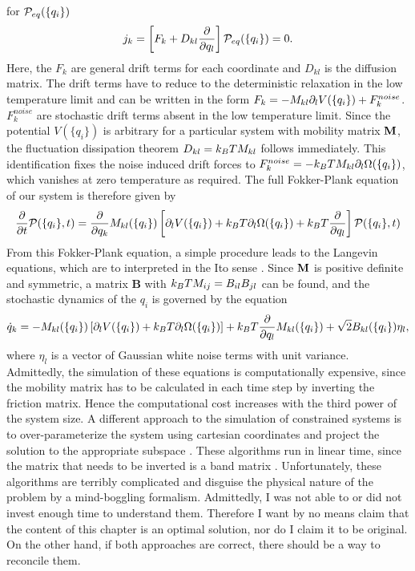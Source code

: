 for ${\cal P}_{eq}(\{q_i\})$
\begin{equation}
\label{eq:probFlux}
	j_k= \left[F_k +D_{kl} \frac{\partial }{\partial q_l} \right]{\cal P}_{eq}(\{q_i\})=0.
\end{equation}
Here, the $F_k$ are general drift terms for each coordinate and $D_{kl}$ is the diffusion matrix. 
The  drift terms have to reduce to the deterministic relaxation
in the low temperature limit and can be written in the form $F_k=-M_{kl}\partial_l V(\{q_i\})+F_k^{noise}$.
$F_k^{noise}$ are stochastic drift terms absent in the low temperature limit. Since
the potential $V(\{q_i\})$ is arbitrary for a particular system with mobility matrix $\mathbf{M}$, 
the fluctuation dissipation theorem $D_{kl}=k_BT M_{kl}$ follows immediately. This identification 
fixes the noise induced drift forces to $F_k^{noise}=-k_BT M_{kl} \partial_l \Omega(\{q_i\})$, which 
vanishes at zero temperature as required.
The full Fokker-Plank equation of our system is therefore given by
\begin{equation}
\label{eq:ContrainedFPE}
\frac{\partial }{\partial t}{\cal P}(\{q_i\},t)= \frac{\partial}{\partial q_k} M_{kl}(\{q_i\})
\left[ \partial_l V(\{q_i\})+k_BT \partial_l \Omega(\{q_i\})+k_BT\frac{\partial}{\partial q_l}\right] {\cal P}(\{q_i\},t)
\end{equation}
From this Fokker-Plank equation, a simple procedure leads to the Langevin equations, which are to 
interpreted in the Ito sense \cite{Gardiner_04}. Since $\mathbf{M}$ is positive definite and symmetric, 
a matrix $\mathbf{B}$ with $k_BT M_{ij}=B_{il}B_{jl}$ can be found, and the stochastic dynamics of the $q_i$
is governed by the equation
\begin{equation}
\label{eq:LangevinEQ}
\dot{q}_k=-M_{kl}(\{q_i\})\left[\partial_l V(\{q_i\})+k_BT \partial_l \Omega(\{q_i\})\right]
+k_BT\frac{\partial }{\partial q_l}M_{kl}(\{q_i\})+\sqrt{2}B_{kl}(\{q_i\})\eta_l,
\end{equation}
where $\eta_l$ is a vector of Gaussian white noise terms with unit variance. Admittedly, the simulation
of these equations is computationally expensive, since the mobility matrix has to be calculated in each time
step by inverting the friction matrix. Hence the computational cost increases with the third power
of the system size. A different approach to 
the simulation of constrained systems is to over-parameterize the system using cartesian coordinates 
and project the solution 
to the appropriate subspace \cite{Hinch_JFluidMech_94, Morse_AdChemPhys_04}. These algorithms
run in linear time, since the matrix that needs to be inverted is a band matrix \cite{Pasquali_JChemPhys_02}.
Unfortunately, these algorithms are terribly complicated and disguise the physical nature of the 
problem by a mind-boggling formalism. Admittedly, I was not able to or did not invest enough time
to understand them. Therefore I want by no means claim that the content of this chapter is an optimal
solution, nor do I claim it to be original. On the other hand, if both approaches are correct, there
should be a way to reconcile them. 


